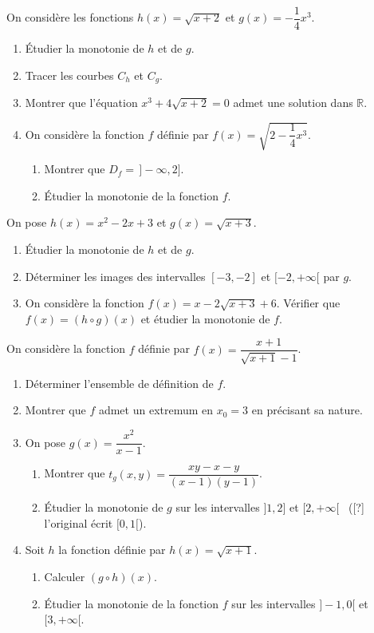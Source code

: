 On considère les fonctions $h(x)=\sqrt{x+2}$ et $g(x)=-\dfrac14x^3$.
\begin{enumerate}
\item Étudier la monotonie de $h$ et de $g$.
\item Tracer les courbes $C_h$ et $C_g$.
\item Montrer que l'équation $x^3+4\sqrt{x+2}=0$ admet une solution dans $\mathbb{R}$.
\item On considère la fonction $f$ définie par $f(x)=\sqrt{2-\dfrac14x^3}$.
\begin{enumerate}
\item Montrer que $D_f=\,]-\infty,2]$.
\item Étudier la monotonie de la fonction $f$.
\end{enumerate}
\end{enumerate}
\fin
{}
On pose $h(x)=x^2-2x+3$ et $g(x)=\sqrt{x+3}$.
\begin{enumerate}
\item Étudier la monotonie de $h$ et de $g$.
\item Déterminer les images des intervalles $[-3,-2]$ et $[-2,+\infty[$ par $g$.
\item On considère la fonction $f(x)=x-2\sqrt{x+3}+6$. Vérifier que $f(x)=(h\circ g)(x)$ et étudier la monotonie de $f$.
\end{enumerate}
\fin
{}
On considère la fonction $f$ définie par $f(x)=\dfrac{x+1}{\sqrt{x+1}-1}$.
\begin{enumerate}
\item Déterminer l'ensemble de définition de $f$.
\item Montrer que $f$ admet un extremum en $x_0=3$ en précisant sa nature.
\item On pose $g(x)=\dfrac{x^2}{x-1}$.
\begin{enumerate}
\item Montrer que $t_g(x,y)=\dfrac{xy-x-y}{(x-1)(y-1)}$.
\item Étudier la monotonie de $g$ sur les intervalles $]1,2]$ et $[2,+\infty[$ \ ([?] l'original écrit $[0,1[$).
\end{enumerate}
\item Soit $h$ la fonction définie par $h(x)=\sqrt{x+1}$.
\begin{enumerate}
\item Calculer $(g\circ h)(x)$.
\item Étudier la monotonie de la fonction $f$ sur les intervalles $]-1,0[$ et $[3,+\infty[$.
\end{enumerate}
\end{enumerate}
